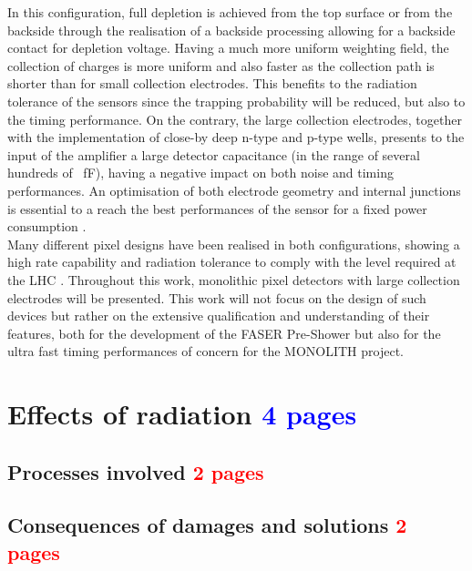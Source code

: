 		In this configuration, full depletion is achieved from the top surface or from the backside through the realisation of a backside processing allowing for a backside contact for depletion voltage.
		Having a much more uniform weighting field, the collection of charges is more uniform and also faster as the collection path is shorter than for small collection electrodes. This benefits to the radiation tolerance of the sensors since the trapping probability will be reduced, but also to the timing performance. On the contrary, the large collection electrodes, together with the implementation of close-by deep n-type and p-type wells, presents to the input of the amplifier a large detector capacitance (in the range of several hundreds of \SI{}{\femto\farad}), having a negative impact on both noise and timing performances. An optimisation of both electrode geometry and internal junctions is essential to a reach the best performances of the sensor for a fixed power consumption \cite{Picardi_thesis}. \\
		
		Many different pixel designs have been realised in both configurations, showing a high rate capability and radiation tolerance to comply with the level required at the LHC \cite{detectors}. Throughout this work, monolithic pixel detectors with large collection electrodes will be presented. This work will not focus on the design of such devices but rather on the extensive qualification and understanding of their features, both for the development of the FASER Pre-Shower but also for the ultra fast timing performances of concern for the MONOLITH project. 
		\clearpage

	\section{Effects of radiation \textcolor{blue}{ 4 pages}}\label{sec:2.6}
		\subsection{Processes involved \textcolor{red}{ 2 pages}}\label{subsec:2.6.1}
		\subsection{Consequences of damages and solutions \textcolor{red}{ 2 pages}}\label{subsec:2.6.2}
